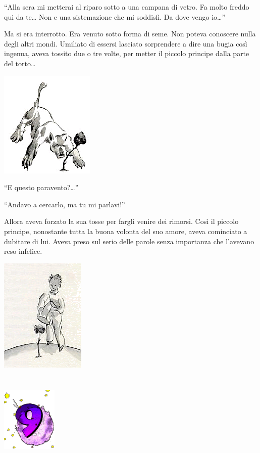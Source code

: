 \documentclass[11pt]{scrbook}
\begin{document}
``Alla sera mi metterai al riparo sotto a una campana di vetro. Fa molto
freddo qui da te\ldots{} Non e una sistemazione che mi soddisfi. Da dove
vengo io\ldots{}''

Ma si era interrotto. Era venuto sotto forma di seme. Non poteva
conoscere nulla degli altri mondi. Umiliato di essersi lasciato
sorprendere a dire una bugia così ingenua, aveva tossito due o tre
volte, per metter il piccolo principe dalla parte del torto\ldots{}

\begin{center}
\includegraphics{img/8d}
\end{center}

``E questo paravento?\ldots{}''

``Andavo a cercarlo, ma tu mi parlavi!''

Allora aveva forzato la sua tosse per fargli venire dei rimorsi. Così il
piccolo principe, nonostante tutta la buona volonta del suo amore, aveva
cominciato a dubitare di lui. Aveva preso sul serio delle parole senza
importanza che l'avevano reso infelice.

\begin{center}
\includegraphics{img/princKvetina}
\end{center}

\chapter{}
\begin{center}
\includegraphics{img/chapter9}
\end{center}
\end{document}

